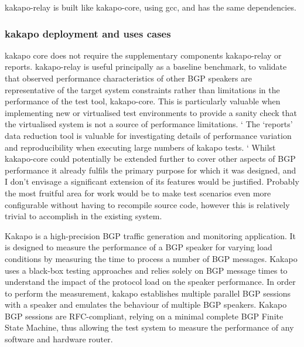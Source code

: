 kakapo-relay is built like kakapo-core, using gcc, and has the same dependencies.

\subsubsection*{ kakapo deployment and uses cases}

kakapo core does not require the supplementary components kakapo-relay or reports.  kakapo-relay is useful principally as a baseline benchmark, to validate that observed performance characteristics of other BGP speakers are representative of the target system constraints rather than limitations in the performance of the test tool, kakapo-core.  This is particularly valuable when implementing new or virtualised test environments to provide a sanity check that the virtualised system is not a source of performance limitations.  `
The ‘reports’ data reduction tool is valuable for investigating details of performance variation and reproducibility when executing large numbers of kakapo tests.  `
Whilst kakapo-core could potentially  be extended further to cover other aspects of BGP performance it already fulfils the primary purpose for which it was designed, and I don’t envisage a significant extension of its features would be justified.  Probably the most fruitful area for work would be to make test scenarios even more configurable without having to recompile source code, however this is relatively trivial to accomplish in the existing system.


Kakapo is a high-precision BGP traffic generation and monitoring application.
It is designed to measure the performance of a BGP speaker for varying load conditions by measuring the time to process a number of BGP messages.
Kakapo uses a black-box testing approaches and relies solely on BGP message times to understand the impact of the protocol load on the speaker performance.
In order to perform the measurement, kakapo establishes multiple parallel BGP sessions with a speaker and emulates the behaviour of multiple BGP speakers.
Kakapo BGP sessions are RFC-compliant, relying on a minimal complete BGP Finite State Machine, thus allowing the test system to measure the performance of any software and hardware router.


